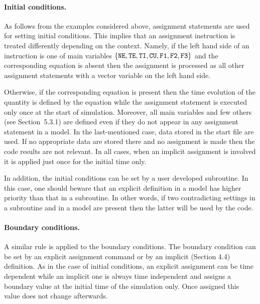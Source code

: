 \paragraph{Initial conditions.}
As follows from the examples considered above, assignment statements 
are used for setting initial conditions. 
This implies that an assignment instruction is treated differently
depending on the context. 
Namely, if the left hand side of an instruction is one of main variables
$\{{\tt NE, TE, TI, CU, F1, F2, F3}\}$ and the corresponding equation 
is absent then the assignment is processed as all other assignment
statements with a vector variable on the left hand side.

Otherwise, if the corresponding equation is present then the time
evolution of the quantity is defined by the equation while the
assignment statement is executed only once at the start of simulation.
Moreover, all main variables and few others (see Section~5.3.1) are
defined even if they do not appear in any assignment statement in a
model. 
In the last-mentioned case, data stored in the start file are used.
If no appropriate data are stored there and no assignment is made then
the code results are not relevant. 
In all cases, when an implicit assignment is involved it is applied just
once for the initial time only.

In addition, the initial conditions can be set by a user developed
subroutine. 
In this case, one should beware that an explicit definition in a model
has higher priority than that in a subroutine. 
In other words, if two contradicting settings in a subroutine and in a
model are present then the latter will be used by the code.

\paragraph{Boundary conditions.}
A similar rule is applied to the boundary conditions.
The boundary condition can be set by an explicit assignment command or
by an implicit (Section 4.4) definition.
As in the case of initial conditions, an explicit assignment can be time
dependent while an implicit one is always time independent and assigns a
boundary value at the initial time of the simulation only. 
Once assigned this value does not change afterwards.

